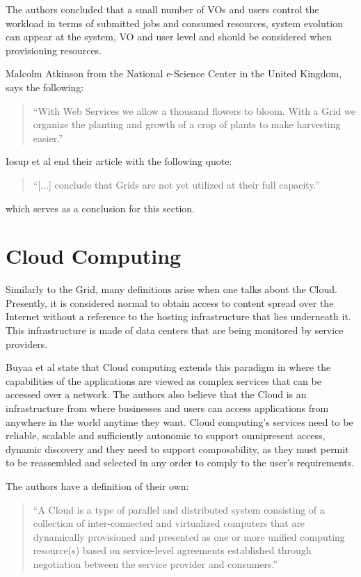 The authors concluded that a small number of VOs and users control the workload in terms of submitted jobs and consumed resources, system evolution can appear at the system, VO and user level and should be considered when provisioning resources.\cite{iosup}

Malcolm Atkinson from the National e-Science Center in the United Kingdom, says the following:
\begin{quote}
``With Web Services we allow a thousand flowers to bloom. With a Grid we organize the planting and growth of a crop of plants to make harvesting easier.''\cite{stockinger}
\end{quote}

Iosup et al end their article with the following quote:

\begin{quote}
``[...] conclude that Grids are not yet utilized at their full capacity.''\cite{iosup}
\end{quote}

which serves as a conclusion for this section.

\section{Cloud Computing} \label{sec:cloud}

Similarly to the Grid, many definitions arise when one talks about the Cloud. Presently, it is considered normal to obtain access to content spread over the Internet without a reference to the hosting infrastructure that lies underneath it. This infrastructure is made of data centers that are being monitored by service providers. 

Buyaa et al state that Cloud computing extends this paradigm in where the capabilities of the applications are viewed as complex services that can be accessed over a network. The authors also believe that the Cloud is an infrastructure from where businesses and users can access applications from anywhere in the world anytime they want. Cloud computing's services need to be reliable, scalable and sufficiently autonomic to support omnipresent access, dynamic discovery and they need to support composability, as they must permit to be reassembled and selected in any order to comply to the user's requirements.

The authors have a definition of their own:

\begin{quote}
``A Cloud is a type of parallel and distributed system consisting of a collection of inter-connected and virtualized computers that are dynamically provisioned and presented as one or more unified computing resource(s) based on service-level agreements established through negotiation between the service provider and consumers.'' \cite{Buyya2009599}
\end{quote}

